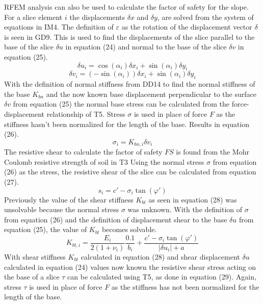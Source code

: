 \documentclass[12pt]{article}
\begin{document}
RFEM analysis can also be used to calculate the factor of safety for the slope. For a slice element $i$ the displacements $\delta{}x$ and $\delta{}y$, are solved from the system of equations in IM4. The definition of $\varepsilon{}$ as the rotation of the displacement vector $\delta{}$ is seen in GD9. This is used to find the displacements of the slice parallel to the base of the slice $\delta{}u$ in equation (24) and normal to the base of the slice $\delta{}v$ in equation (25).
\begin{equation}
{\delta{}u}_{i}=\cos\left(\alpha{}_{i}\right){\delta{}x}_{i}+\sin\left(\alpha{}_{i}\right){\delta{}y}_{i}
\end{equation}
\begin{equation}
{\delta{}v}_{i}=\left(-\sin\left(\alpha{}_{i}\right)\right){\delta{}x}_{i}+\sin\left(\alpha{}_{i}\right){\delta{}y}_{i}
\end{equation}
With the definition of normal stiffness from DD14 to find the normal stiffness of the base $K_{bn}$ and the now known base displacement perpendicular to the surface $\delta{}v$ from equation (25) the normal base stress can be calculated from the force-displacement relationship of T5. Stress $\sigma{}$ is used in place of force $F$ as the stiffness hasn't been normalized for the length of the base. Results in equation (26).
\begin{equation}
\sigma{}_{i}=K_{bn,i}{\delta{}v}_{i}
\end{equation}
The resistive shear to calculate the factor of safety $FS$ is found from the Mohr Coulomb resistive strength of soil in T3 Using the normal stress $\sigma{}$ from equation (26) as the stress, the resistive shear of the slice can be calculated from equation (27).
\begin{equation}
s_{i}=c'-\sigma{}_{i}\tan\left(\varphi{}'\right)
\end{equation}
Previously the value of the shear stiffness $K_{bt}$ as seen in equation (28) was unsolvable because the normal stress $\sigma{}$ was unknown. With the definition of $\sigma{}$ from equation (26) and the definition of displacement shear to the base $\delta{}u$ from equation (25), the value of $K_{bt}$ becomes solvable.
\begin{equation}
K_{bt,i}=\frac{E_{i}}{2\left(1+\nu{}_{i}\right)}\frac{0.1}{b_{i}}+\frac{c'-\sigma{}_{i}\tan\left(\varphi{}'\right)}{|{\delta{}u}_{i}|+a}
\end{equation}
With shear stiffness $K_{bt}$ calculated in equation (28) and shear displacement $\delta{}u$ calculated in equation (24) values now known the resistive shear stress acting on the base of a slice $\tau{}$ can be calculated using T5, as done in equation (29). Again, stress $\tau{}$ is used in place of force $F$ as the stiffness has not been normalized for the length of the base.
\end{document}
